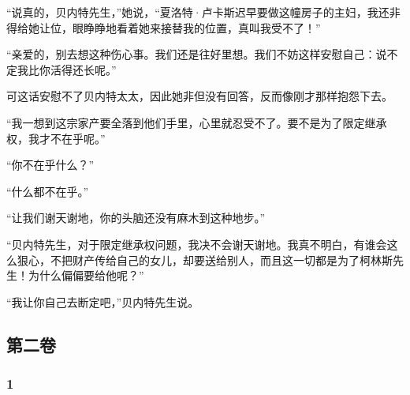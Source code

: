 \par “说真的，贝内特先生，”她说，“夏洛特·卢卡斯迟早要做这幢房子的主妇，我还非得给她让位，眼睁睁地看着她来接替我的位置，真叫我受不了！”
\par “亲爱的，别去想这种伤心事。我们还是往好里想。我们不妨这样安慰自己：说不定我比你活得还长呢。”
\par 可这话安慰不了贝内特太太，因此她非但没有回答，反而像刚才那样抱怨下去。
\par “我一想到这宗家产要全落到他们手里，心里就忍受不了。要不是为了限定继承权，我才不在乎呢。”
\par “你不在乎什么？”
\par “什么都不在乎。”
\par “让我们谢天谢地，你的头脑还没有麻木到这种地步。”
\par “贝内特先生，对于限定继承权问题，我决不会谢天谢地。我真不明白，有谁会这么狠心，不把财产传给自己的女儿，却要送给别人，而且这一切都是为了柯林斯先生！为什么偏偏要给他呢？”
\par “我让你自己去断定吧，”贝内特先生说。








\subsection*{第二卷}


\subsubsection*{1}

